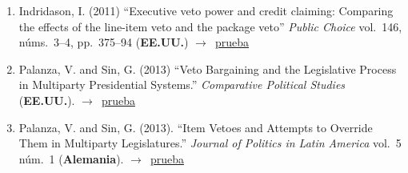 \documentclass[12 pt, letter]{article}
\newenvironment{CitasMiTrabajo}{
    \begin{footnotesize}
    \begin{enumerate}[label={\footnotesize\emph{cita~\arabic*}},ref=\arabic*] %
        \setlength{\itemsep}{.1\itemsep}
        \setlength{\parskip}{.1\parskip}
    }{\end{enumerate}\end{footnotesize}}
\begin{document}
\begin{CitasMiTrabajo}
        \item Indridason, I. (2011) ``Executive veto power and credit claiming: Comparing the effects of the line-item veto and the package veto''
            \emph{Public Choice} vol.\ 146, n\'ums.\ 3--4, pp.~375--94 (\textbf{EE.UU.}) $\rightarrow$~\href{http://ericmagar.com/cv/cites/BullyPulpits/indridasson2011pubcho.pdf}{prueba}

        \item Palanza, V. and Sin, G. (2013) ``Veto Bargaining and the Legislative Process in Multiparty Presidential Systems.'' \emph{Comparative Political Studies} (\textbf{EE.UU.}). $\rightarrow$~\href{http://ericmagar.com/cv/cites/BullyPulpits/palanza.sin2013jpla.excerpts.pdf}{prueba}

        \item Palanza, V. and Sin, G. (2013). ``Item Vetoes and Attempts to Override Them in Multiparty Legislatures.'' \emph{Journal of Politics in Latin America} vol.~5 n\'um.~1 (\textbf{Alemania}). $\rightarrow$~\href{http://ericmagar.com/cv/cites/BullyPulpits/sin.palanza2014cps.excerpts.pdf}{prueba}


        \label{ncites:magar.2001} %





        \end{CitasMiTrabajo}
\end{document}
